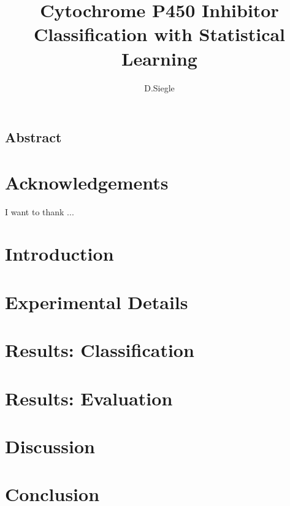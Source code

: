 \documentclass[12pt]{report}
\author{D.Siegle}
\title{Cytochrome P450 Inhibitor Classification with Statistical Learning}
\date{}
\begin{document}
\maketitle

\begin{doublespacing}
\chapter*{Abstract}

\end{doublespacing}

\tableofcontents
\listoffigures
\listoftables

\begin{doublespacing}
\chapter*{Acknowledgements}
I want to thank ...

\chapter{Introduction}


\chapter{Experimental Details}


\chapter{Results: Classification}


\chapter{Results: Evaluation}



\chapter{Discussion}


\chapter{Conclusion}


\end{doublespacing}

{}

\end{document}
